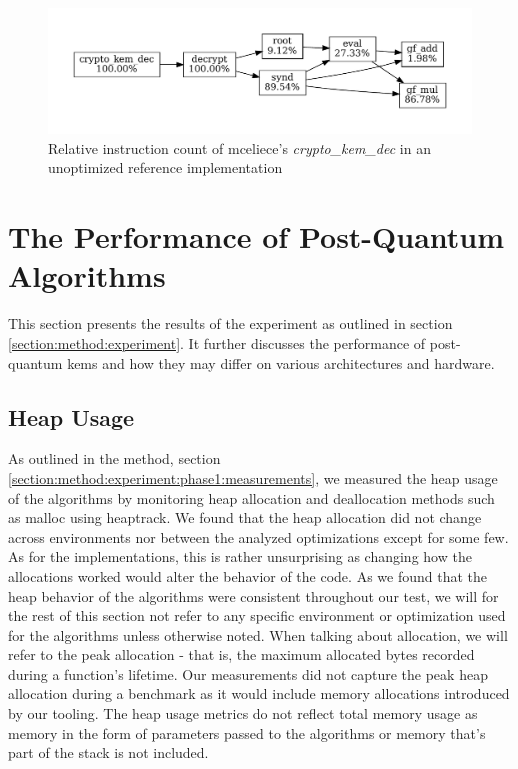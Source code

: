 \begin{figure}[H]
    \centering
    \includegraphics[scale=0.5]{chapters/results/hot-paths/classic-mceliece/8192128/crypto_kem_dec.pdf}
    \caption{Relative instruction count of \gls{mceliece}'s \textit{crypto\_kem\_dec} in an unoptimized reference implementation}
    \label{figure:result:hot-paths:classic-mceliece:crypto_kem_dec}
\end{figure}

\section{The Performance of Post-Quantum Algorithms}

This section presents the results of the experiment as outlined in section \ref{section:method:experiment}. It further discusses the performance of \gls{post-quantum} \glspl{kem} and how they may differ on various architectures and hardware.

\subsection{Heap Usage}

As outlined in the method, section \ref{section:method:experiment:phase1:measurements}, we measured the heap usage of the algorithms by monitoring heap allocation and deallocation methods such as malloc using heaptrack. We found that the heap allocation did not change across environments nor between the analyzed optimizations except for some few. As for the implementations, this is rather unsurprising as changing how the allocations worked would alter the behavior of the code. As we found that the heap behavior of the algorithms were consistent throughout our test, we will for the rest of this section not refer to any specific environment or optimization used for the algorithms unless otherwise noted. When talking about allocation, we will refer to the peak allocation - that is, the maximum allocated bytes recorded during a function's lifetime. Our measurements did not capture the peak heap allocation during a benchmark as it would include memory allocations introduced by our tooling. The heap usage metrics do not reflect total memory usage as memory in the form of parameters passed to the algorithms or memory that's part of the stack is not included.

